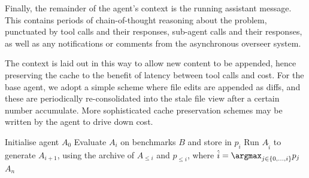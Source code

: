 Finally, the remainder of the  agent's context is the running assistant
message. This contains periods of chain-of-thought reasoning about the problem,
punctuated by tool calls and their responses, sub-agent calls and their
responses, as well as any notifications or comments from the asynchronous
overseer system.

The  context is laid out in this way to allow new content to be
appended, hence preserving the  cache to the benefit of latency between
tool calls and cost. For the base agent, we adopt a simple scheme where file
edits are appended as diffs, and these are periodically re-consolidated into the
stale file view after a certain number accumulate. More sophisticated 
cache preservation schemes may be written by the agent to drive down cost.

\begin{algorithm}[t]
  Initialise agent $A_{0}$\;
   {
    Evaluate $A_{i}$ on benchmarks $B$ and store in $p_{i}$\;
    Run $A_{\hat{i}}$ to generate $A_{i+1}$, using the archive of $A_{\le i}$
    and $p_{\le i}$, where $\hat{i} = \argmax_{j \in \{0, \ldots, i\}}p_{j}$\;
  }
  \Return $A_{n}$\;
  \caption{\label{algo:adas}Self-Referential Agent Improvement.}
\end{algorithm}
